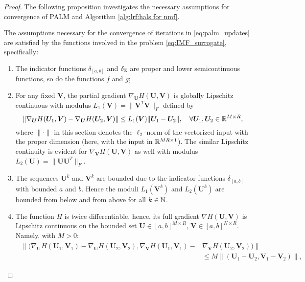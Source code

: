 \begin{proof}
    The following proposition investigates the necessary assumptions for convergence of PALM and Algorithm \ref{alg:lrf:hals for nmf}.
    \begin{prop}\label{prop:assumptions}
        The assumptions necessary for the convergence of iterations in \eqref{eq:palm_updates} are satisfied by the functions involved in the problem \eqref{eq:IMF_surrogate}, specifically:
        \begin{enumerate}
            \item The indicator functions $\delta_{[a,b]}$ and $\delta_\mathbb Z$ are proper and lower semicontinuous functions, so do the functions $f$ and $g$;
            \item For any fixed $\bm V$, the partial gradient $\nabla_{\bm U} H(\bm U, \bm V)$ is globally Lipschitz continuous with modulus $L_1(\bm V) = \|\bm V^T \bm V\|_F$ defined by
            \begin{equation*}
                \|\nabla_{\bm U} H(\bm U_1, \bm V) - \nabla_{\bm U} H(\bm U_2, \bm V)\| \leq L_1(\bm V) \|\bm U_1 - \bm U_2\|, \quad \forall \bm U_1,\bm U_2 \in \mathbb{R}^{M\times R},
            \end{equation*}
            where $\|\cdot\|$ in this section denotes the $\ell_2$-norm of the vectorized input with the proper dimension (here, with the input in $\mathbb{R}^{MR\times 1}$).
            The similar Lipschitz continuity is evident for $\nabla_{\bm V} H(\bm U, \bm V)$ as well with modulus $L_2(\bm U) = \|\bm U \bm U^T\|_F$.
            \item The sequences $\bm U^k$ and $\bm V^k$ are bounded due to the indicator functions $\delta_{[a,b]}$ with bounded $a$ and $b$. Hence the moduli $L_1(\bm V^k)$ and $L_2(\bm U^k)$ are bounded from below and from above for all $k\in\mathbb N$.
            \item The function $H$ is twice differentiable, hence, its full gradient $\nabla H(\bm U,\bm V)$ is Lipschitz continuous on the bounded set $\bm U \in [a,b]^{M\times R}$, $\bm V \in [a,b]^{N\times R}$. Namely, with $M > 0$:
            \begin{align}
                \begin{split}
                    \|(\nabla_{\bm U} H(\bm U_1, \bm V_1) - \nabla_{\bm U} H(\bm U_2, \bm V_2), \nabla_{\bm V} H(\bm U_1, \bm V_1) - &\nabla_{\bm V} H(\bm U_2, \bm V_2))\| \\
                    &\leq M \|(\bm U_1 - \bm U_2, \bm V_1 - \bm V_2)\|,
                \end{split}

\end{align}
\end{enumerate}
\end{prop}
\end{proof}
